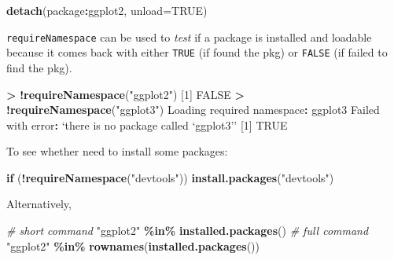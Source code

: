 \documentclass[
]{book}
\newenvironment{Shaded}{\begin{snugshade}}{\end{snugshade}}
\newcommand{\AttributeTok}[1]{\textcolor[rgb]{0.13,0.29,0.53}{#1}}
\newcommand{\CommentTok}[1]{\textcolor[rgb]{0.56,0.35,0.01}{\textit{#1}}}
\newcommand{\ConstantTok}[1]{\textcolor[rgb]{0.56,0.35,0.01}{#1}}
\newcommand{\ControlFlowTok}[1]{\textcolor[rgb]{0.13,0.29,0.53}{\textbf{#1}}}
\newcommand{\DecValTok}[1]{\textcolor[rgb]{0.00,0.00,0.81}{#1}}
\newcommand{\FunctionTok}[1]{\textcolor[rgb]{0.13,0.29,0.53}{\textbf{#1}}}
\newcommand{\NormalTok}[1]{#1}
\newcommand{\SpecialCharTok}[1]{\textcolor[rgb]{0.81,0.36,0.00}{\textbf{#1}}}
\newcommand{\StringTok}[1]{\textcolor[rgb]{0.31,0.60,0.02}{#1}}
\begin{document}
\begin{Shaded}
\begin{Highlighting}[]
\FunctionTok{detach}\NormalTok{(package}\SpecialCharTok{:}\NormalTok{ggplot2, }\AttributeTok{unload=}\ConstantTok{TRUE}\NormalTok{)}
\end{Highlighting}
\end{Shaded}

\texttt{requireNamespace} can be used to \emph{test} if a package is installed and loadable because it comes back with either \texttt{TRUE} (if found the pkg) or \texttt{FALSE} (if failed to find the pkg).

\begin{Shaded}
\begin{Highlighting}[]
\SpecialCharTok{\textgreater{}} \SpecialCharTok{!}\FunctionTok{requireNamespace}\NormalTok{(}\StringTok{"ggplot2"}\NormalTok{)}
\NormalTok{[}\DecValTok{1}\NormalTok{] }\ConstantTok{FALSE}
\SpecialCharTok{\textgreater{}} \SpecialCharTok{!}\FunctionTok{requireNamespace}\NormalTok{(}\StringTok{"ggplot3"}\NormalTok{)}
\NormalTok{Loading required namespace}\SpecialCharTok{:}\NormalTok{ ggplot3}
\NormalTok{Failed with error}\SpecialCharTok{:}\NormalTok{  ‘there is no package called ‘ggplot3’’}
\NormalTok{[}\DecValTok{1}\NormalTok{] }\ConstantTok{TRUE}
\end{Highlighting}
\end{Shaded}

To see whether need to install some packages:

\begin{Shaded}
\begin{Highlighting}[]
\ControlFlowTok{if}\NormalTok{ (}\SpecialCharTok{!}\FunctionTok{requireNamespace}\NormalTok{(}\StringTok{"devtools"}\NormalTok{)) }\FunctionTok{install.packages}\NormalTok{(}\StringTok{"devtools"}\NormalTok{)}
\end{Highlighting}
\end{Shaded}

Alternatively,

\begin{Shaded}
\begin{Highlighting}[]
\CommentTok{\# short command}
\StringTok{"ggplot2"} \SpecialCharTok{\%in\%} \FunctionTok{installed.packages}\NormalTok{()}
\CommentTok{\# full command}
\StringTok{"ggplot2"} \SpecialCharTok{\%in\%} \FunctionTok{rownames}\NormalTok{(}\FunctionTok{installed.packages}\NormalTok{())}
\end{Highlighting}
\end{Shaded}
\end{document}
